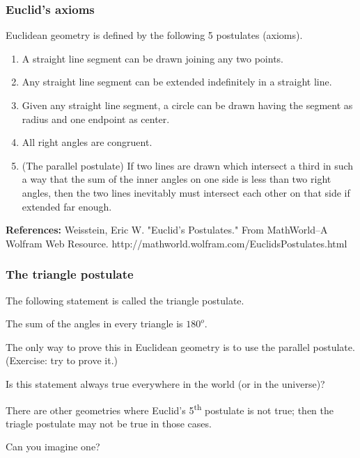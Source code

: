 \begin{frame}\frametitle{Euclid's axioms}
  Euclidean geometry is defined by the following 5 postulates
  (axioms).
  \pause
  \begin{enumerate}
  \item A straight line segment can be drawn joining any two points.
    \pause
  \item Any straight line segment can be extended indefinitely in a straight line.
    \pause
  \item Given any straight line segment, a circle can be drawn having the segment as radius and one endpoint as center.
    \pause
  \item All right angles are congruent.
    \pause
  \item (The parallel postulate) If two lines are drawn which
    intersect a third in such a way that the sum of the inner angles
    on one side is less than two right angles, then the two lines
    inevitably must intersect each other on that side if extended far
    enough.
    \pause
  \end{enumerate}

  {\bf References:} Weisstein, Eric W. "Euclid's Postulates." From
  MathWorld--A Wolfram Web
  Resource. http://mathworld.wolfram.com/EuclidsPostulates.html
\end{frame}

\begin{frame}\frametitle{The triangle postulate}
  The following statement is called the triangle postulate.
  \begin{tcolorbox}
    The sum of the angles in every triangle is $180^{o}$.
  \end{tcolorbox}

  The only way to prove this in Euclidean geometry is to use the
  parallel postulate.  (Exercise: try to prove it.)\pause 

  Is this statement always true everywhere in the world (or in the
  universe)? \pause

  There are other geometries where Euclid's 5\textsuperscript{th}
  postulate is not true; then the triagle postulate may not be true in
  those cases.

  Can you imagine one?
\end{frame}
